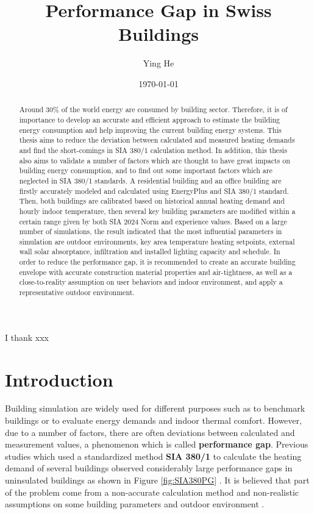 \documentclass[a4paper, oneside]{discothesis}
\title{Performance Gap in Swiss Buildings}
\author{Ying He}
\institute{Chair of Building Physics\\[2pt]
ETH Zürich\\[2pt]
Laboratory for Urban Energy Systems\\[2pt]
Empa,Dübendorf\\[2pt]}
\date{\today}
\begin{document}
\frontmatter %
\maketitle

\cleardoublepage

\begin{acknowledgements}
 I thank xxx
\end{acknowledgements}


\begin{abstract}
 	Around 30\% of the world energy are consumed by building sector. Therefore, it is of importance to develop an accurate and efficient approach to estimate the building energy consumption and help improving the current building energy systems. This thesis aims to reduce the deviation between calculated and measured heating demands and find the short-comings in SIA 380/1 calculation method. In addition, this thesis also aims to validate a number of factors which are thought to have great impacts on building energy consumption, and to find out some important factors which are neglected in SIA 380/1 standards. A residential building and an office building are firstly accurately modeled and calculated using EnergyPlus and SIA 380/1 standard. Then, both buildings are  calibrated based on historical annual heating demand and hourly indoor temperature, then several key building parameters are modified within a certain range given by both SIA 2024 Norm and experience values. Based on a large number of simulations, the result indicated that the most influential parameters in simulation are outdoor environments, key area temperature heating setpoints, external wall solar absorptance, infiltration and installed lighting capacity and schedule. In order to reduce the performance gap, it is recommended to create an accurate building envelope with accurate construction material properties and air-tightness, as well as a close-to-reality assumption on user behaviors and indoor environment, and apply a representative outdoor environment.
\end{abstract}

\tableofcontents

\mainmatter %

\chapter{Introduction}
	Building simulation are widely used for different purposes such as to benchmark buildings or to evaluate energy demands and indoor thermal comfort. However, due to a number of factors, there are often deviations between calculated  and measurement values, a phenomenon which is called \textbf{performance gap}. Previous studies which used a standardized method \textbf{SIA 380/1} to calculate the heating demand of several buildings observed considerably large performance gaps in uninsulated buildings as shown in Figure \ref{fig:SIA380PG} \cite{SIAPreviousreport}. It is believed that part of the problem come from a non-accurate calculation method and non-realistic assumptions on some building parameters and outdoor environment \cite{SIAPreviousreport}. \\
\end{document}
